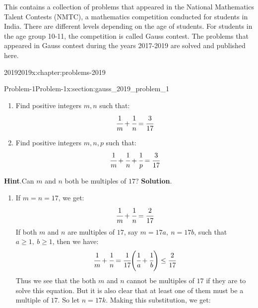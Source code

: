 \documentclass[oneside,10pt,]{book}
\newcommand{\blocktitlefont}{\relax}
\numberwithin{equation}{section}
\begin{document}
This contains a collection of problems that appeared in the National Mathematics Talent Contests (NMTC), a mathematics competition conducted for students in India. There are different levels depending on the age of students. For students in the age group 10-11, the competition is called Gauss contest. The problems that appeared in Gauss contest during the years 2017-2019 are solved and published here.%
%
%
\typeout{************************************************}
\typeout{************************************************}
%
\begin{chapterptx}{2019}{}{2019}{}{}{x:chapter:problems-2019}
%
%
\typeout{************************************************}
\typeout{************************************************}
%
\begin{sectionptx}{Problem-1}{}{Problem-1}{}{}{x:section:gauss_2019_problem_1}
%
\begin{enumerate}
\item{}Find positive integers \(m, n\) such that:%
\begin{equation*}
\cfrac{1}{m} + \cfrac{1}{n} = \cfrac{3}{17}
\end{equation*}
%
\item{}Find positive integers \(m, n, p\) such that:%
\begin{equation*}
\cfrac{1}{m} + \cfrac{1}{n} + \cfrac{1}{p} = \cfrac{3}{17}
\end{equation*}
%
\end{enumerate}
\textbf{\blocktitlefont Hint}.\quad{}Can \(m\) and \(n\) both be multiples of \(17\)?%
\textbf{\blocktitlefont Solution}.\quad{}%
\begin{enumerate}
\item{}If \(m = n = 17\), we get:%
\begin{equation*}
\cfrac{1}{m} + \cfrac{1}{n} = \cfrac{2}{17}
\end{equation*}
If both \(m\) and \(n\) are multiples of \(17\), say \(m = 17a,\ n = 17b\), such that \(a \geq 1,\ b \geq 1\), then we have:%
\begin{equation*}
\cfrac{1}{m} + \cfrac{1}{n} = \cfrac{1}{17} \Bigg( \cfrac{1}{a} + \cfrac{1}{b} \Bigg) \leq \cfrac{2}{17}
\end{equation*}
Thus we see that the both \(m\) and \(n\) cannot be multiples of \(17\) if they are to solve this equation. But it is also clear that at least one of them must be a multiple of \(17\). So let \(n = 17k\). Making this substitution, we get:%
\begin{align*}

\end{align*}
\end{enumerate}
\end{sectionptx}
\end{chapterptx}
\end{document}
